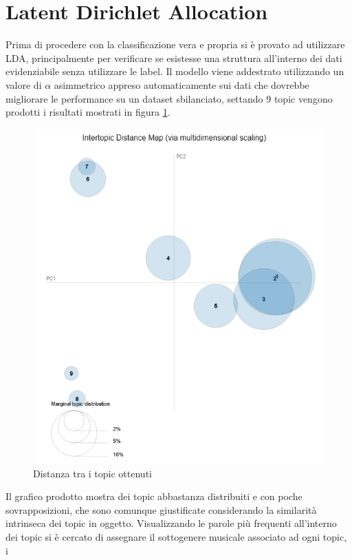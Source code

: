 \documentclass[technote]{IEEEtran}
\begin{document}
\section{Latent Dirichlet Allocation}
Prima di procedere con la classificazione vera e propria
si è provato ad utilizzare LDA, principalmente per verificare
se esistesse una struttura all'interno dei dati evidenziabile senza utilizzare
le label.
Il modello viene addestrato utilizzando un valore di $ \alpha $ asimmetrico
appreso automaticamente sui dati che dovrebbe migliorare le performance su
un dataset sbilanciato, settando 9 topic vengono prodotti i
risultati mostrati in figura \ref{fig_topic_pca}.
\begin{figure}[H]
\centerline{\includegraphics[width=1\columnwidth, scale=0.3]{images/topic_pca}}
\caption{Distanza tra i topic ottenuti}
\label{fig_topic_pca}
\end{figure}
Il grafico prodotto mostra dei topic abbastanza distribuiti e con poche
sovrapposizioni, che sono comunque giustificate considerando
la similarità intrinseca dei topic in oggetto.
Visualizzando le parole più frequenti all'interno dei topic si è cercato di
assegnare il sottogenere musicale associato ad ogni topic, i
\end{document}
